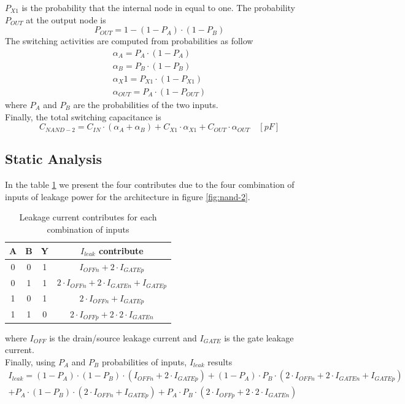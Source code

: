 $P_{X1}$ is the probability that the internal node in equal to one. The probability $P_{OUT}$ at the output node is
\begin{equation}
P_{OUT}=1-(1-P_A) \cdotp (1-P_B)
\end{equation}
The switching activities are computed from probabilities as follow
\begin{eqnarray}
\alpha_A = P_A \cdotp (1-P_A)\\
\alpha_B = P_B \cdotp (1-P_B)\\
\alpha_X1 = P_{X1} \cdotp (1-P_{X1})\\
\alpha_{OUT} = P_A \cdotp (1-P_{OUT})
\end{eqnarray}
where $P_A$ and $P_B$ are the probabilities of the two inputs. \\Finally, the total switching capacitance is
\begin{equation}
C_{NAND-2}=C_{IN} \cdotp (\alpha_A + \alpha_B) + C_{X1} \cdotp \alpha_{X1} + C_{OUT} \cdotp \alpha_{OUT} \quad [pF]
\end{equation}

\subsection{Static Analysis}
In the table \ref{tab:i_leakage} we present the four contributes due to the four combination of inputs of leakage power for the architecture in figure \ref{fig:nand-2}.
\begin{table}[htb]
\centering
\begin{tabular}{|c|c||c||c|}
\hline
A & B & Y & $I_{leak}$ contribute\\
\hline
0 & 0 & 1 & $I_{OFFn}+2\cdotp I_{GATEp}$\\
\hline
0 & 1 & 1 & $2\cdotp I_{OFFn}+2\cdotp I_{GATEn}+I_{GATEp}$\\
\hline
1 & 0 & 1 & $2\cdotp I_{OFFn}+I_{GATEp}$\\
\hline
1 & 1 & 0 & $2\cdotp I_{OFFp}+2\cdotp 2\cdotp I_{GATEn}$\\
\hline
\end{tabular}
\caption{Leakage current contributes for each combination of inputs}
\label{tab:i_leakage}
\end{table}
where $I_{OFF}$ is the drain/source leakage current and $I_{GATE}$ is the gate leakage current. \\Finally, using $P_A$ and $P_B$ probabilities of inputs, $I_{leak}$ results
\begin{multline}
I_{leak}=(1-P_A)\cdotp(1-P_B)\cdotp(I_{OFFn}+2\cdotp I_{GATEp})+(1-P_A)\cdotp P_B\cdotp(2\cdotp I_{OFFn}+2\cdotp I_{GATEn}+I_{GATEp})\\
+P_A\cdotp(1-P_B)\cdotp(2\cdotp I_{OFFn}+I_{GATEp})+P_A\cdotp P_B\cdotp(2\cdotp I_{OFFp}+2\cdotp 2\cdotp I_{GATEn})
\end{multline}

